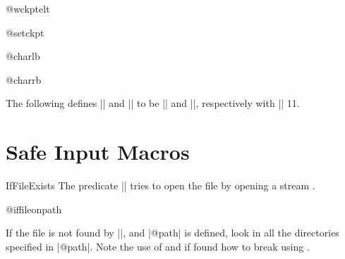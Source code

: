 \begin{multicols}
 \begin{docCommand}{@wckptelt}{}
 \end{docCommand}
    \begin{teX}
\def\@wckptelt#1{%
  \immediate\write\@partaux{%
    \string\setcounter{#1}{\the\@nameuse{c@#1}}}}
    \end{teX}


 \begin{docCommand}{@setckpt}{}
 \end{docCommand}
    \begin{teX}
\def\@setckpt#1{\global\@namedef{cp@#1}}
    \end{teX}


 \begin{docCommand}{@charlb}{}
 \begin{docCommand}{@charrb}{}
 \end{docCommand}
 \end{docCommand}
 The following defines |\@charlb| and |\@charrb| to be |{| and |}|,
 respectively with |\catcode| 11.
    \begin{teX}
{\catcode`[=1 \catcode`]=2
\catcode`{=11 \catcode`}=11
\gdef\@charlb[{]
\gdef\@charrb[}]
]%
    \end{teX}


 \section{Safe Input Macros}

 \begin{docCommand}{IfFileExists}{}
 The predicate |\IfFileExists| tries to open the file by opening
 a stream . 
 \end{docCommand}

 \begin{teX}
\long{}
 \end{teX}


 \begin{docCommand}{@iffileonpath}{}
 \end{docCommand}
 If the file is not found by |\openin|, and |@path| is defined,
 look in all the directories specified in |@path|. Note the 
 use of  and if found how to break using .
    \begin{teX}
\long\def\@iffileonpath#1{%
  \let\reserved@a\@secondoftwo
  \expandafter\@tfor\expandafter\reserved@b\expandafter
             :\expandafter=@path\do{%
    \openin\@inputcheck\reserved@b#1 %
    \ifeof\@inputcheck\else
      \edef\@filef@und{\reserved@b#1 }%
      \let\reserved@a\@firstoftwo%
      \closein\@inputcheck
      \@break@tfor
    \fi}%
  \reserved@a}
    \end{teX}



\end{multicols}
